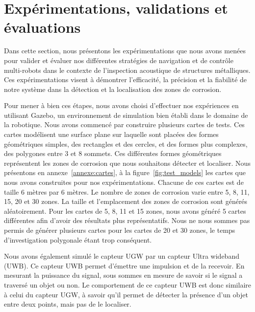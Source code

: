 \documentclass[francais,RandD]{rapportPFE}
\begin{document}
	\section{Expérimentations, validations et évaluations}
		Dans cette section, nous présentons les expérimentations que nous avons menées pour valider et évaluer nos différentes stratégies de navigation et de contrôle multi-robots dans le contexte de l'inspection acoustique de structures métalliques.
		Ces expérimentations visent à démontrer l'efficacité, la précision et la fiabilité de notre système dans la détection et la localisation des zones de corrosion.

		Pour mener à bien ces étapes, nous avons choisi d'effectuer nos expériences en utilisant Gazebo, un environnement de simulation bien établi dans le domaine de la robotique.
		Nous avons commencé par construire plusieurs cartes de tests.
		Ces cartes modélisent une surface plane sur laquelle sont placées des formes géométriques simples, des rectangles et des cercles, et des formes plus complexes, des polygones entre 3 et 8 sommets.
		Ces différentes formes géométriques représentent les zones de corrosion que nous souhaitons détecter et localiser.
		Nous présentons en annexe~\ref{annexe:cartes}, à la figure~\ref{fig:test_models} les cartes que nous avons construites pour nos expérimentations.
		Chacune de ces cartes est de taille 6 mètres par 6 mètres.
		Le nombre de zones de corrosion varie entre 5, 8, 11, 15, 20 et 30 zones.
		La taille et l'emplacement des zones de corrosion sont générés aléatoirement.
		Pour les cartes de 5, 8, 11 et 15 zones, nous avons généré 5 cartes différentes afin d'avoir des résultats plus représentatifs.
		Nous ne nous sommes pas permis de générer plusieurs cartes pour les cartes de 20 et 30 zones, le temps d'investigation polygonale étant trop conséquent.

		Nous avons également simulé le capteur UGW par un capteur Ultra wideband (UWB).
		Ce capteur UWB permet d'émettre une impulsion et de la recevoir.
		En mesurant la puissance du signal, sous sommes en mesure de savoir si le signal a traversé un objet ou non.
		Le comportement de ce capteur UWB est donc similaire à celui du capteur UGW, à savoir qu'il permet de détecter la présence d'un objet entre deux points, mais pas de le localiser.
\end{document}

